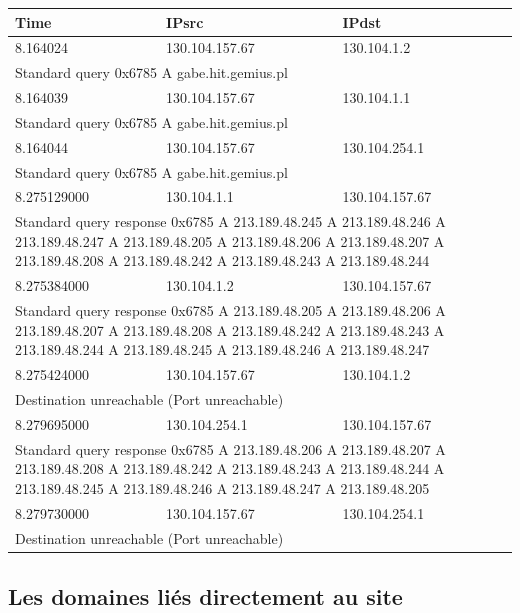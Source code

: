 \documentclass[conference]{IEEEtran}
\begin{document}
\begin{tabular}{|l|l|l|}
 \hline
 \rowcolor{gray!60} Time & IPsrc & IPdst \\
 \hline
 \rowcolor{cyan} 8.164024 & 130.104.157.67 & 130.104.1.2 \\
 \multicolumn{3}{|p{8cm}|}{Standard query 0x6785  A gabe.hit.gemius.pl} \\
 \hline
 \rowcolor{cyan} 8.164039 & 130.104.157.67 & 130.104.1.1 \\
 \multicolumn{3}{|p{8cm}|}{Standard query 0x6785  A gabe.hit.gemius.pl} \\
 \hline
 \rowcolor{cyan} 8.164044 & 130.104.157.67 & 130.104.254.1 \\
 \multicolumn{3}{|p{8cm}|}{Standard query 0x6785  A gabe.hit.gemius.pl} \\
 \hline
  \hline
 \rowcolor{cyan} 8.275129000 & 130.104.1.1 & 130.104.157.67 \\
  \multicolumn{3}{|p{8cm}|}{Standard query response 0x6785  A 213.189.48.245 A 213.189.48.246 A 213.189.48.247 A 213.189.48.205 A 213.189.48.206 A 213.189.48.207 A 213.189.48.208 A 213.189.48.242 A 213.189.48.243 A 213.189.48.244} \\
  \hline
 \rowcolor{red!70} 8.275384000 & 130.104.1.2 & 130.104.157.67 \\
  \multicolumn{3}{|p{8cm}|}{Standard query response 0x6785  A 213.189.48.205 A 213.189.48.206 A 213.189.48.207 A 213.189.48.208 A 213.189.48.242 A 213.189.48.243 A 213.189.48.244 A 213.189.48.245 A 213.189.48.246 A 213.189.48.247} \\
  \hline
 \rowcolor{black!65} 8.275424000 & 130.104.157.67 & 130.104.1.2 \\
  \multicolumn{3}{|p{8cm}|}{Destination unreachable (Port unreachable)} \\
  \hline
 \rowcolor{red!70} 8.279695000 & 130.104.254.1 & 130.104.157.67 \\
  \multicolumn{3}{|p{8cm}|}{Standard query response 0x6785  A 213.189.48.206 A 213.189.48.207 A 213.189.48.208 A 213.189.48.242 A 213.189.48.243 A 213.189.48.244 A 213.189.48.245 A 213.189.48.246 A 213.189.48.247 A 213.189.48.205} \\
  \hline
 \rowcolor{black!65} 8.279730000 & 130.104.157.67 & 130.104.254.1 \\
  \multicolumn{3}{|p{8cm}|}{Destination unreachable (Port unreachable)} \\
  \hline
\end{tabular}


\subsection{Les domaines liés directement au site}
\end{document}
